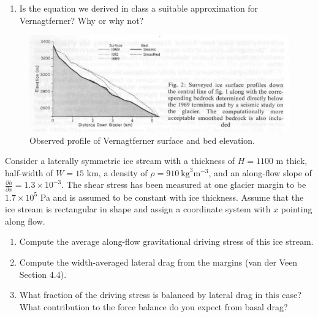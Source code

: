 \documentclass[12pt]{article}
\newenvironment{problem}[2][Problem]{\begin{trivlist}
\item[\hskip \labelsep {\bfseries #1}\hskip \labelsep {\bfseries #2.}]}{\end{trivlist}}
\begin{document}
\begin{problem}{1}
\begin{enumerate}[itemsep=2pt]
    \item Is the equation we derived in class a suitable approximation for Vernagtferner?  Why or why not?
\end{enumerate}

\begin{figure}
    \centering
    \includegraphics[width=0.9\linewidth]{figs/Screen Shot 2021-10-01 at 2.13.57 PM.png}
    \caption{Observed profile of Vernagtferner surface and bed elevation.\footnotemark}
    \label{fig:vernagtferner}
\end{figure}
\end{problem}


\begin{problem}{2}
[5 pts] Consider a laterally symmetric ice stream with a thickness of $H=1100$ m thick, half-width of $W=15$ km, a density of $\rho = 910 \:\text{kg}^3\text{m}^{-3}$, and an along-flow slope of $\frac{\partial h}{\partial x} = 1.3 \times 10^{-3}$. The shear stress has been measured at one glacier margin to be $1.7 \times 10^5$ Pa and is assumed to be constant with ice thickness. Assume that the ice stream is rectangular in shape and assign a coordinate system with $x$ pointing along flow. 
\renewcommand{\labelenumi}{(\alph{enumi})}
\begin{enumerate}[itemsep=2pt]
    \item Compute the average along-flow gravitational driving stress of this ice stream.
    \item Compute the width-averaged lateral drag from the margins (van der Veen Section 4.4).
    \item What fraction of the driving stress is balanced by lateral drag in this case?  What contribution to the force balance do you expect from basal drag?
\end{enumerate}
\end{problem}
\end{document}
